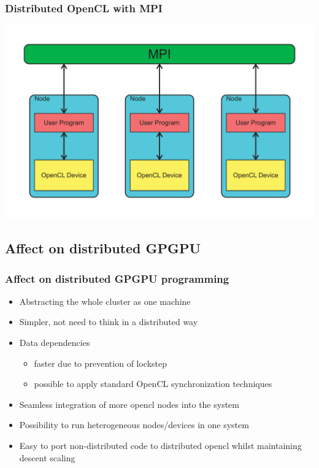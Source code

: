 \documentclass{beamer}
\begin{document}
\begin{frame}
    \frametitle{Distributed OpenCL with MPI}
    \includegraphics[width=\textwidth]{../2014-09-25_gputalk/mpi_opencl.pdf}
\end{frame}



\subsection{Affect on distributed GPGPU}

\begin{frame}
    \frametitle{Affect on distributed GPGPU programming}
    \begin{itemize}
        \item Abstracting the whole cluster as one machine
        \item Simpler, not need to think in a distributed way
        \item Data dependencies
        \begin{itemize}
            \item faster due to prevention of lockstep
            \item possible to apply standard OpenCL synchronization techniques
        \end{itemize}
        \item Seamless integration of more opencl nodes into the system
        \item Possibility to run heterogeneous nodes/devices in one system
        \item Easy to port non-distributed code to distributed opencl whilst
              maintaining descent scaling
    \end{itemize}
\end{frame}
\end{document}
